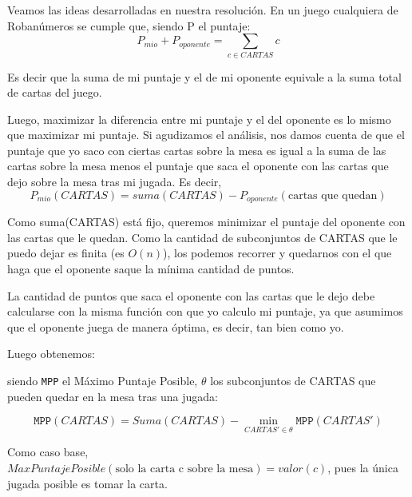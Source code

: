 \documentclass[11pt, a4paper, twoside]{article}
\begin{document}
{}

Veamos las ideas desarrolladas en nuestra resolución. En un juego cualquiera de
Robanúmeros se cumple que, siendo P el puntaje:
\[
P_{mio} + P_{oponente} = \sum_{c \in CARTAS}{c}
\]

Es decir que la suma de mi puntaje y el de mi oponente equivale a la suma total
de cartas del juego.

Luego, maximizar la diferencia entre mi puntaje y el del oponente es lo mismo
que maximizar mi puntaje. Si agudizamos el análisis, nos damos cuenta de que el
puntaje que yo saco con ciertas cartas sobre la mesa es igual a la suma de las
cartas sobre la mesa menos el puntaje que saca el oponente con las cartas que
dejo sobre la mesa tras mi jugada. Es decir, 
\[
P_{mio}(CARTAS) = suma(CARTAS) - P_{oponente}(\text{cartas que quedan})
\]

Como suma(CARTAS) está fijo, queremos minimizar el puntaje del oponente con las
cartas que le quedan. Como la cantidad de subconjuntos de CARTAS que le puedo
dejar es finita (es $O(n)$), los podemos recorrer y quedarnos con el que haga
que el oponente saque la mínima cantidad de puntos.

La cantidad de puntos que saca el oponente con las cartas que le dejo debe calcularse con la misma función con que yo calculo mi puntaje, ya que asumimos que el oponente juega de manera óptima, es decir, tan bien como yo. 

Luego obtenemos:
\begin{proposicion}\label{prop:ej1-mpp}

siendo \texttt{MPP} el Máximo Puntaje Posible, $\theta$ los subconjuntos de
CARTAS que pueden quedar en la mesa tras una jugada:

\[
\texttt{MPP}(CARTAS) = Suma(CARTAS) - \min\limits_{CARTAS' \in \theta} \texttt{MPP}(CARTAS')
\]
\end{proposicion}

Como caso base, $MaxPuntajePosible(\text{solo la carta c sobre la mesa}) = valor(c)$,
pues la única jugada posible es tomar la carta.
\end{document}
